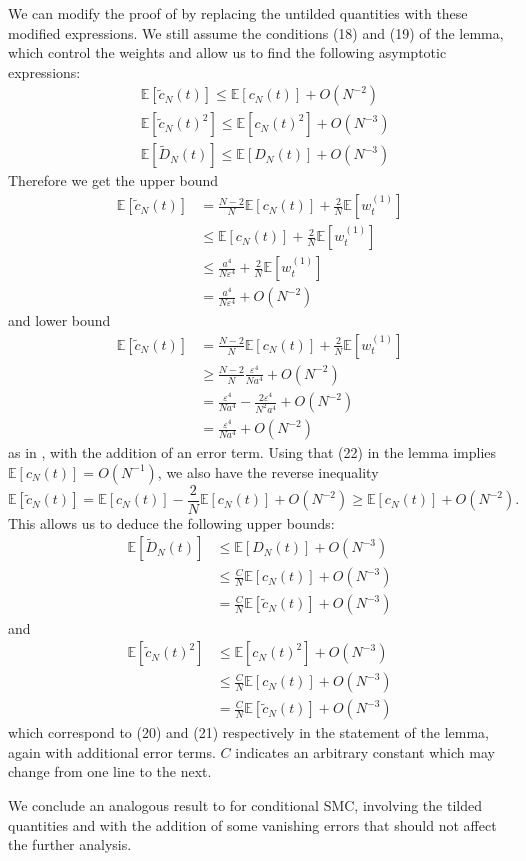 \documentclass{article}
\newcommand{\E}{\mathbb{E}}
\newcommand{\wt}[2][t]{w_{#1}^{(#2)}}
\begin{document}
We can modify the proof of \citet[Lemma 3]{koskela2018} by replacing the untilded quantities with these modified expressions.
We still assume the conditions (18) and (19) of the lemma, which control the weights and allow us to find the following asymptotic expressions:
\begin{align*}
& \E[\tilde{c}_N(t)] \leq \E[c_N(t)] + O(N^{-2}) \\
& \E[\tilde{c}_N(t)^2] \leq \E[c_N(t)^2] + O(N^{-3}) \\
& \E[\tilde{D}_N(t)] \leq \E[D_N(t)] +O(N^{-3})
\end{align*}
Therefore we get the upper bound
\begin{align*}
\E[\tilde{c}_N(t)] &= \frac{N-2}{N} \E[c_N(t)] + \frac{2}{N} \E[\wt{1}] \\
& \leq \E[c_N(t)] + \frac{2}{N} \E[\wt{1}] \\
&\leq \frac{a^4}{N\varepsilon^4} +  \frac{2}{N} \E[\wt{1}] \\
&= \frac{a^4}{N\varepsilon^4} + O(N^{-2})
\end{align*}
and lower bound
\begin{align*}
\E[\tilde{c}_N(t)] &= \frac{N-2}{N} \E[c_N(t)] + \frac{2}{N} \E[\wt{1}] \\
& \geq  \frac{N-2}{N}\frac{\varepsilon^4}{Na^4} + O(N^{-2}) \\
& = \frac{\varepsilon^4}{Na^4} - \frac{2\varepsilon^4}{N^2a^4} + O(N^{-2}) \\
& = \frac{\varepsilon^4}{Na^4} + O(N^{-2})
\end{align*}
as in \citet{koskela2018}, with the addition of an error term.
Using that (22) in the lemma implies $\E[c_N(t)] = O(N^{-1})$, we also have the reverse inequality
\begin{equation*}
\E[\tilde{c}_N(t)] = \E[c_N(t)] - \frac{2}{N}\E[c_N(t)] + O(N^{-2}) \geq \E[c_N(t)] + O(N^{-2}).
\end{equation*}
This allows us to deduce the following upper bounds:
\begin{align*}
\E[\tilde{D}_N(t)] &\leq \E[D_N(t)] + O(N^{-3}) \\
&\leq \frac{C}{N} \E[c_N(t)] + O(N^{-3}) \\
&= \frac{C}{N} \E[\tilde{c}_N(t)] + O(N^{-3})
\end{align*}
and
\begin{align*}
\E[\tilde{c}_N(t)^2] &\leq \E[c_N(t)^2] + O(N^{-3}) \\
&\leq \frac{C}{N} \E[c_N(t)] + O(N^{-3}) \\
&= \frac{C}{N} \E[\tilde{c}_N(t)] + O(N^{-3})
\end{align*}
which correspond to (20) and (21) respectively in the statement of the lemma, again with additional error terms. $C$ indicates an arbitrary constant which may change from one line to the next.

We conclude an analogous result to \citet[Lemma 3]{koskela2018} for conditional SMC, involving the tilded quantities and with the addition of some vanishing errors that should not affect the further analysis.


\end{document}
